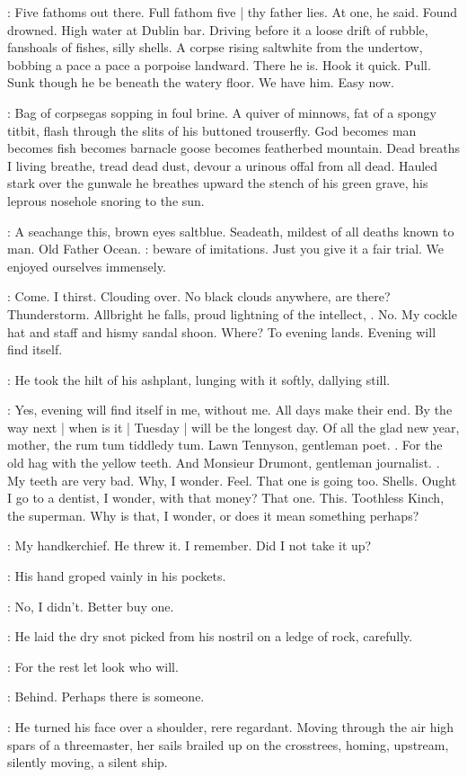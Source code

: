 \StephenInt:
Five fathoms out there.
Full fathom five |
thy father lies.
At one, he said.
Found drowned.
High water at Dublin bar.
Driving before it a loose drift of rubble,
fanshoals of fishes, silly shells.
A corpse rising saltwhite from the undertow,
bobbing a pace a pace a porpoise landward.
There he is.
Hook it quick.
Pull.
Sunk though he be beneath the watery floor.
We have him.
Easy now.

\StephenInt:
Bag of corpsegas sopping in foul brine.
A quiver of minnows,
fat of a spongy titbit,
flash through the slits of his buttoned trouserfly.
God becomes man
becomes fish
becomes barnacle goose
becomes featherbed mountain.
Dead breaths I living breathe,
tread dead dust,
devour a urinous offal from all dead.
Hauled stark over the gunwale
he breathes upward the stench of his green grave,
his leprous nosehole snoring to the sun.

\StephenInt:
A seachange this, brown eyes saltblue.
Seadeath, mildest of all deaths known to man.
Old Father Ocean.
:
beware of imitations.
Just you give it a fair trial.
We enjoyed ourselves immensely.

\StephenInt:
Come.
I thirst.
Clouding over.
No black clouds anywhere, are there?
Thunderstorm.
Allbright he falls, proud lightning of the intellect,
.
No.
My cockle hat and staff and hismy sandal shoon.
Where?
To evening lands.
Evening will find itself.

:
He took the hilt of his ashplant,
lunging with it softly, dallying still.

\StephenInt:
Yes, evening will find itself in me,
without me.
All days make their end.
By the way next |
when is it |
Tuesday |
will be the longest day.
Of all the glad new year,
mother, the rum tum tiddledy tum.
Lawn Tennyson, gentleman poet.
.
For the old hag with the yellow teeth.
And Monsieur Drumont,
gentleman journalist.
.
My teeth are very bad.
Why, I wonder.
Feel.
That one is going too.
Shells.
Ought I go to a dentist, I wonder, with that money?
That one.
This.
Toothless Kinch, the superman.
Why is that, I wonder,
or does it mean something perhaps?

\StephenInt:
My handkerchief.
He threw it.
I remember.
Did I not take it up?

:
His hand groped vainly in his pockets.

\StephenInt:
No, I didn't.
Better buy one.

:
He laid the dry snot picked from his nostril
on a ledge of rock,
carefully.

\StephenInt:
For the rest let look who will.

\StephenInt:
Behind.
Perhaps there is someone.

:
He turned his face over a shoulder, rere regardant.
Moving through the air high spars of a threemaster,
her sails brailed up on the crosstrees,
homing, upstream, silently moving,
a silent ship.
